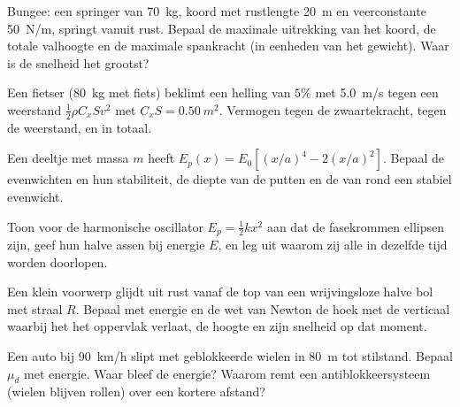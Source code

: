 \begin{exercise}[$\star\star$]\label{exo:b1:work-and-energy:7}
Bungee: een springer van \qty{70}{kg}, koord met rustlengte \qty{20}{m} en
veerconstante \qty{50}{N/m}, springt vanuit rust. Bepaal de maximale uitrekking van
het koord, de totale valhoogte en de maximale spankracht (in eenheden van het
gewicht). Waar is de snelheid het grootst?
\end{exercise}

\begin{exercise}[$\star\star$]\label{exo:b1:work-and-energy:8}
Een fietser (\qty{80}{kg} met fiets) beklimt een helling van $5\%$ met \qty{5.0}{m/s}
tegen een weerstand $\tfrac12\rho C_xSv^2$ met $C_xS = \qty{0.50}{m^2}$.
Vermogen tegen de zwaartekracht, tegen de weerstand, en in totaal.
\end{exercise}

\begin{exercise}[$\star\star$]\label{exo:b1:work-and-energy:9}
Een deeltje met massa $m$ heeft $E_p(x) = E_0[(x/a)^4 - 2(x/a)^2]$. Bepaal de
evenwichten en hun stabiliteit, de diepte van de putten en de
 van  rond een stabiel evenwicht.
\end{exercise}

\begin{exercise}[$\star\star\star$]\label{exo:b1:work-and-energy:10}
Toon voor de harmonische oscillator $E_p = \tfrac12 kx^2$ aan dat de
fasekrommen ellipsen zijn, geef hun halve assen bij energie $E$, en leg uit
waarom zij alle in dezelfde tijd worden doorlopen.
\end{exercise}

\begin{exercise}[$\star\star\star$]\label{exo:b1:work-and-energy:11}
Een klein voorwerp glijdt uit rust vanaf de top van een wrijvingsloze halve bol
met straal $R$. Bepaal met energie en de wet van Newton de hoek met de
verticaal waarbij het het oppervlak verlaat, de hoogte en zijn snelheid op
dat moment.
\end{exercise}

\begin{exercise}[$\star\star\star$]\label{exo:b1:work-and-energy:12}
Een auto bij \qty{90}{km/h} slipt met geblokkeerde wielen in \qty{80}{m} tot
stilstand. Bepaal $\mu_d$ met energie. Waar bleef de energie? Waarom remt een
antiblokkeersysteem (wielen blijven rollen) over een kortere afstand?
\end{exercise}


